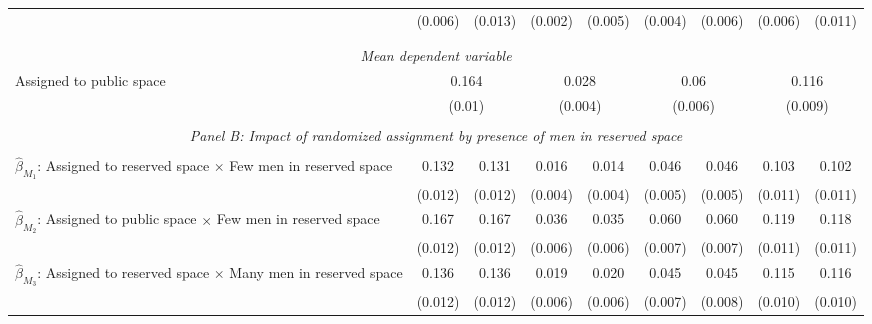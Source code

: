 \begin{tabular}{l*{8}{c}}
                    &     (0.006)         &     (0.013)         &     (0.002)         &     (0.005)         &     (0.004)         &     (0.006)         &     (0.006)         &     (0.011)         \\
\\[-1.8ex] \hline \\[-1.8ex] \multicolumn{9}{c}{\textit{Mean dependent variable}} \\ Assigned to public space & \multicolumn{2}{c}{0.164} & \multicolumn{2}{c}{0.028} & \multicolumn{2}{c}{0.06} & \multicolumn{2}{c}{0.116} \\ \, & \multicolumn{2}{c}{(0.01)} & \multicolumn{2}{c}{(0.004)} & \multicolumn{2}{c}{(0.006)} & \multicolumn{2}{c}{(0.009)} \\ 

\hline \\[-1ex] \multicolumn{9}{c}{\textit{Panel B: Impact of randomized assignment by presence of men in reserved space}} \\\\[-1ex]
$\hat\beta_{M_1}$: Assigned to reserved space $\times$ Few men in reserved space&       0.132\sym{***}&       0.131\sym{***}&       0.016\sym{***}&       0.014\sym{***}&       0.046\sym{***}&       0.046\sym{***}&       0.103\sym{***}&       0.102\sym{***}\\
                    &     (0.012)         &     (0.012)         &     (0.004)         &     (0.004)         &     (0.005)         &     (0.005)         &     (0.011)         &     (0.011)         \\
[1em]
$\hat\beta_{M_2}$: Assigned to public space $\times$ Few men in reserved space&       0.167\sym{***}&       0.167\sym{***}&       0.036\sym{***}&       0.035\sym{***}&       0.060\sym{***}&       0.060\sym{***}&       0.119\sym{***}&       0.118\sym{***}\\
                    &     (0.012)         &     (0.012)         &     (0.006)         &     (0.006)         &     (0.007)         &     (0.007)         &     (0.011)         &     (0.011)         \\
[1em]
$\hat\beta_{M_3}$: Assigned to reserved space $\times$ Many men in reserved space&       0.136\sym{***}&       0.136\sym{***}&       0.019\sym{***}&       0.020\sym{***}&       0.045\sym{***}&       0.045\sym{***}&       0.115\sym{***}&       0.116\sym{***}\\
                    &     (0.012)         &     (0.012)         &     (0.006)         &     (0.006)         &     (0.007)         &     (0.008)         &     (0.010)         &     (0.010)         \\

\end{tabular}
